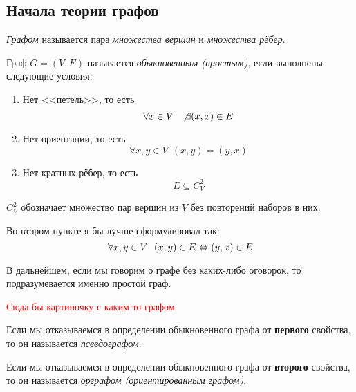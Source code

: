 \subsection{Начала теории графов}

\begin{definition}
	\textit{Графом} называется пара \textit{множества вершин} и \textit{множества рёбер}.
\end{definition}

\begin{definition}
	Граф $G = (V, E)$ называется \textit{обыкновенным (простым)}, если выполнены следующие условия:
	\begin{enumerate}
		\item Нет <<петель>>, то есть
		\[
			\forall x \in V\ \ \not\exists (x, x) \in E
		\]
		
		\item Нет ориентации, то есть
		\[
			\forall x, y \in V\ \ (x, y) = (y, x)
		\]
		
		\item Нет кратных рёбер, то есть
		\[
			E \subseteq C_V^2
		\]
	\end{enumerate}
\end{definition}

\begin{note}
	$C_V^2$ обозначает множество пар вершин из $V$ без повторений наборов в них.
\end{note}

\begin{anote}
	Во втором пункте я бы лучше сформулировал так:
	\[
		\forall x, y \in V\ \ (x, y) \in E \Leftrightarrow (y, x) \in E
	\]
\end{anote}

\begin{note}
	В дальнейшем, если мы говорим о графе без каких-либо оговорок, то подразумевается именно простой граф.
\end{note}

\textcolor{red}{Сюда бы картиночку с каким-то графом}

\begin{definition}
	Если мы отказываемся в определении обыкновенного графа от \textbf{первого} свойства, то он называется \textit{псевдографом}.
\end{definition}

\begin{definition}
	Если мы отказываемся в определении обыкновенного графа от \textbf{второго} свойства, то он называется \textit{орграфом (ориентированным графом)}.
\end{definition}

